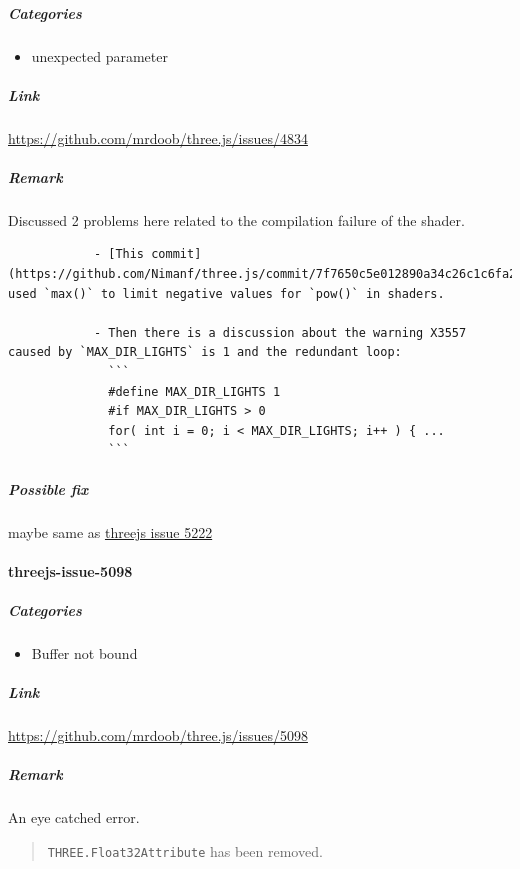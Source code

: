 \documentclass[]{article}
\begin{document}
\subparagraph{Categories}\label{categories-2}

\begin{itemize}
\itemsep1pt\parskip0pt
\item
  unexpected parameter
\end{itemize}

\subparagraph{Link}\label{link-2}

\url{https://github.com/mrdoob/three.js/issues/4834}

\subparagraph{Remark}\label{remark-2}

Discussed 2 problems here related to the compilation failure of the
shader.

\begin{verbatim}
            - [This commit](https://github.com/Nimanf/three.js/commit/7f7650c5e012890a34c26c1c6fa2f8482d855627) used `max()` to limit negative values for `pow()` in shaders.

            - Then there is a discussion about the warning X3557 caused by `MAX_DIR_LIGHTS` is 1 and the redundant loop:
              ```
              #define MAX_DIR_LIGHTS 1
              #if MAX_DIR_LIGHTS > 0
              for( int i = 0; i < MAX_DIR_LIGHTS; i++ ) { ...
              ```
\end{verbatim}

\subparagraph{Possible fix}\label{possible-fix-1}

maybe same as
\href{https://git.ustclug.org/VeriGL/VeriGL-Dark-Side/wikis/threejs-issue-5222}{threejs
issue 5222}

\paragraph{threejs-issue-5098}\label{threejs-issue-5098}

\subparagraph{Categories}\label{categories-3}

\begin{itemize}
\itemsep1pt\parskip0pt
\item
  Buffer not bound
\end{itemize}

\subparagraph{Link}\label{link-3}

\url{https://github.com/mrdoob/three.js/issues/5098}

\subparagraph{Remark}\label{remark-3}

An eye catched error.

\begin{quote}
\texttt{THREE.Float32Attribute} has been removed.
\end{quote}
\end{document}
